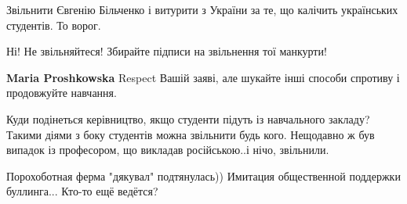 Звільнити Євгенію Більченко і витурити з України за те, що калічить українських студентів. То ворог.

 
Ні! Не звільняйтеся! Збирайте підписи на звільнення тої манкурти!

 
\textbf{Maria Proshkowska}
Respect Вашій заяві, але шукайте інші способи спротиву і продовжуйте навчання.

 

Куди подінеться керівництво, якщо студенти підуть із навчального закладу?
Такими діями з боку студентів можна звільнити будь кого. Нещодавно ж був
випадок із професором, що викладав російською..і нічо, звільнили.

 

Порохоботная ферма "дякувал" подтянулась))
Имитация общественной поддержки буллинга...
Кто-то ещё ведётся?

